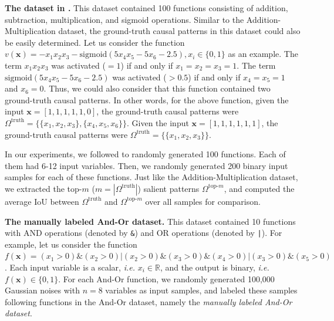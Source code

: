 \textbf{The dataset in \cite{ren2021learning}.}
This dataset contained 100 functions consisting of addition, subtraction, multiplication, and sigmoid operations.
Similar to the Addition-Multiplication dataset, the ground-truth causal patterns in this dataset could also be easily determined.
Let us consider the function {\small$v(\boldsymbol{x})=-x_1x_2x_3-\text{sigmoid}(5x_4x_5-5x_6-2.5), x_i\in\{0,1\}$} as an example.
The term {\small$x_1x_2x_3$} was activated ({\small$=1$}) if and only if {\small$x_1=x_2=x_3=1$}.
The term {\small$\text{sigmoid}(5x_4x_5-5x_6-2.5)$} was activated ({\small$>0.5$}) if and only if {\small$x_4=x_5=1$} and {\small$x_6=0$}.
Thus, we could also consider that this function contained two ground-truth causal patterns.
In other words, for the above function, given the input {\small$\boldsymbol{x}=[1, 1, 1, 1, 1, 0]$}, the ground-truth causal patterns were {\small$\Omega^{\text{truth}}=\{\{x_1,x_2,x_3\},\{x_4,x_5,x_6\}\}$}.
Given the input {\small$\boldsymbol{x}=[1, 1, 1, 1, 1, 1]$}, the ground-truth causal patterns were {\small$\Omega^{\text{truth}}=\{\{x_1,x_2,x_3\}\}$}.

In our experiments, we followed \cite{ren2021learning} to randomly generated 100 functions. Each of them had 6-12 input variables.
Then, we randomly generated 200 binary input samples for each of these functions.
Just like the Addition-Multiplication dataset, we extracted the top-{\small$m$} ({\small $m=|\Omega^{\text{truth}}|$}) salient patterns {\small$\Omega^{\text{top-}m}$}, and computed the average IoU between {\small$\Omega^{\text{truth}}$} and {\small$\Omega^{\text{top-}m}$} over all samples for comparison.


\textbf{The manually labeled And-Or dataset.}
This dataset contained 10 functions with AND operations (denoted by {\small\texttt{\&}}) and OR operations (denoted by {\small\texttt{|}}).
For example, let us consider the function {\small$f(\boldsymbol{x})=(x_1>0) \texttt{\&} (x_2>0) \texttt{|} (x_2>0) \texttt{\&} (x_3>0) \texttt{\&} (x_4>0) \texttt{|} (x_3>0) \texttt{\&} (x_5>0)$}.
Each input variable is a scalar, \emph{i.e.} {\small$x_i\in\mathbb{R}$}, and the output is binary, \emph{i.e.} {\small$f(\boldsymbol{x})\in\{0,1\}$}.
For each And-Or function, we randomly generated 100,000 Gaussian noises with {\small$n=8$} variables as input samples, and labeled these samples following functions in the And-Or dataset, namely the \textit{manually labeled And-Or dataset}.

